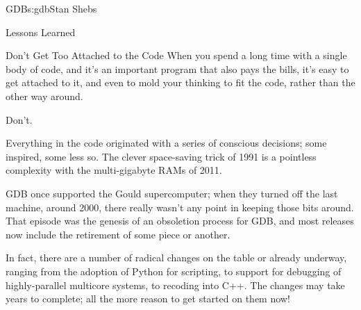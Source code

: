 \begin{aosachapter}{GDB}{s:gdb}{Stan Shebs}
\begin{aosasect1}{Lessons Learned}
\begin{aosasect2}{Don't Get Too Attached to the Code}
When you spend a long time with a single body of code, and it's an
important program that also pays the bills, it's easy to get attached
to it, and even to mold your thinking to fit the code, rather than the
other way around.

Don't.

Everything in the code originated with a series of conscious
decisions; some inspired, some less so.  The clever space-saving trick
of 1991 is a pointless complexity with the multi-gigabyte RAMs of
2011.

GDB once supported the Gould supercomputer; when they turned off the
last machine, around 2000, there really wasn't any point in keeping
those bits around.  That episode was the genesis of an obsoletion
process for GDB, and most releases now include the retirement of
some piece or another.

In fact, there are a number of radical changes on the table or already
underway, ranging from the adoption of Python for scripting, to
support for debugging of highly-parallel multicore systems, to
recoding into C++.  The changes may take years to complete; all the
more reason to get started on them now!

\end{aosasect2}

\end{aosasect1}

\end{aosachapter}
